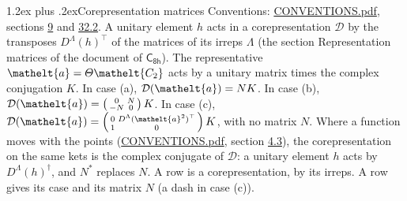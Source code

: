 \documentclass[10pt,a4paper]{article}
\makeatletter
\renewcommand\section{\@startsection{section}{1}{\z@}{-3ex plus -1ex minus -.2ex}%
  {1.2ex plus .2ex}{\normalfont\large\sffamily\bfseries\color{parttitle}}}
\numberwithin{equation}{section}
\newcommand{\eltfont}[1]{{\let\sigma\eltsigma\mathelt{#1}}}
\newcommand{\grp}[1]{\mathsf{#1}}
\newcommand{\elt}[1]{\eltfont{#1}}
\makeatother
\begin{document}
\section{Corepresentation matrices}\label{s:corep_matrices}
Conventions: \href{../../CONVENTIONS.pdf}{CONVENTIONS.pdf}, sections \href{../../../rotation/CONVENTIONS.pdf\#conv.9}{9} and \href{../../CONVENTIONS.pdf\#conv.32.2}{32.2}.
A unitary element $h$ acts in a corepresentation $\mathcal{D}$ by the transposes $D^{\Lambda}(h)^{\top}$ of the matrices of its irreps $\Lambda$ (the section Representation matrices of the document of \href{../../../rotation/data/pdf/C8h.pdf}{$\grp{C_{8h}}$}). The representative $\elt{a} = \varTheta\elt{C_{2}}$ acts by a unitary matrix times the complex conjugation $K$.
In case (a), $\mathcal{D}(\elt{a}) = NK$. In case (b), $\mathcal{D}(\elt{a}) = \left(\begin{smallmatrix} 0 & N \\ -N & 0 \end{smallmatrix}\right) K$. In case (c), $\mathcal{D}(\elt{a}) = \left(\begin{smallmatrix} 0 & D^{\Lambda}(\elt{a}^2)^{\top} \\ 1 & 0 \end{smallmatrix}\right) K$, with no matrix $N$.
Where a function moves with the points (\href{../../CONVENTIONS.pdf}{CONVENTIONS.pdf}, section \href{../../../rotation/CONVENTIONS.pdf\#conv.4.3}{4.3}), the corepresentation on the same kets is the complex conjugate of $\mathcal{D}$: a unitary element $h$ acts by $D^{\Lambda}(h)^{\dagger}$, and $N^{*}$ replaces $N$.
A row is a corepresentation, by its irreps. A row gives its case and its matrix $N$ (a dash in case (c)).
\end{document}
